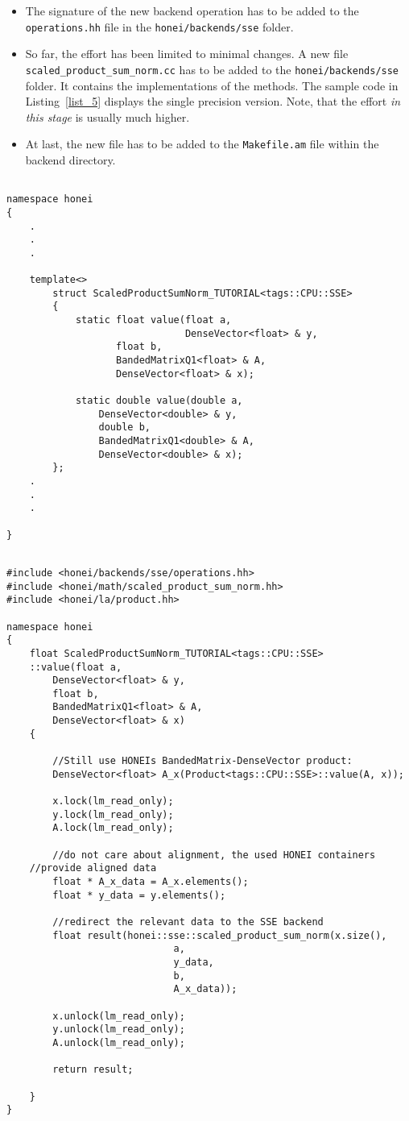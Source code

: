 \documentclass{article}
\begin{document}
\begin{itemize}
\item{The signature of the new backend operation has to be added to the \texttt{operations.hh} file in the \texttt{honei/backends/sse} folder.}
\item{So far, the effort has been limited to minimal changes. A new file \texttt{scaled\_product\_sum\_norm.cc} has to be added to the \texttt{honei/backends/sse} folder. It contains the implementations of the methods. The sample code in Listing~\ref{list_5} displays the single precision version. Note, that the effort \emph{in this stage} is usually much higher.}
\item{At last, the new file has to be added to the \texttt{Makefile.am} file within the backend directory.}
\end{itemize}


\begin{lstlisting}[float, caption= Developing kernels - Adding the specialisation for SSE, label=list_3]

namespace honei
{
    .
    .
    .

    template<>
        struct ScaledProductSumNorm_TUTORIAL<tags::CPU::SSE>
        {
            static float value(float a,
                               DenseVector<float> & y,
			       float b,
			       BandedMatrixQ1<float> & A,
			       DenseVector<float> & x);

            static double value(double a,
				DenseVector<double> & y,
				double b,
				BandedMatrixQ1<double> & A,
				DenseVector<double> & x);
        };
    .
    .
    .

}
\end{lstlisting}

\begin{lstlisting}[float, caption= Developing kernels - Redirection to the SSE backend , label=list_4]

#include <honei/backends/sse/operations.hh>
#include <honei/math/scaled_product_sum_norm.hh>
#include <honei/la/product.hh>

namespace honei
{
    float ScaledProductSumNorm_TUTORIAL<tags::CPU::SSE>
	::value(float a,
		DenseVector<float> & y,
		float b,
		BandedMatrixQ1<float> & A,
		DenseVector<float> & x)
    {

        //Still use HONEIs BandedMatrix-DenseVector product:
        DenseVector<float> A_x(Product<tags::CPU::SSE>::value(A, x));

        x.lock(lm_read_only);
        y.lock(lm_read_only);
        A.lock(lm_read_only);

        //do not care about alignment, the used HONEI containers
	//provide aligned data
        float * A_x_data = A_x.elements();
        float * y_data = y.elements();

        //redirect the relevant data to the SSE backend
        float result(honei::sse::scaled_product_sum_norm(x.size(),
							 a,
							 y_data,
							 b,
							 A_x_data));

        x.unlock(lm_read_only);
        y.unlock(lm_read_only);
        A.unlock(lm_read_only);

        return result;

    }
}
\end{lstlisting}
\end{document}
